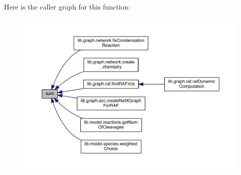 Here is the caller graph for this function\-:
\nopagebreak
\begin{figure}[H]
\begin{center}
\leavevmode
\includegraphics[width=350pt]{a00028_a576bebae86b11914280920c448def53d_icgraph}
\end{center}
\end{figure}


